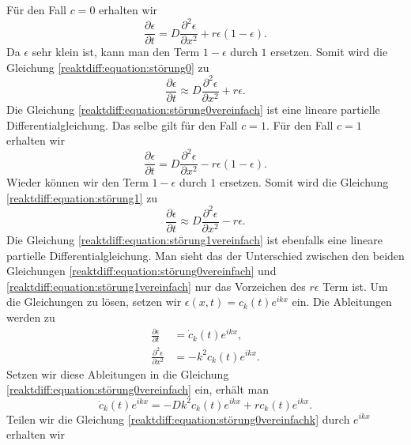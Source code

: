 Für den Fall \(c = 0\) erhalten wir
\begin{equation}
\label{reaktdiff:equation:störung0}
\frac{\partial \epsilon}{\partial t} = D \frac{\partial^2 \epsilon}{\partial x^2} + r\epsilon(1-\epsilon).
\end{equation}
Da \(\epsilon\) sehr klein ist, kann man den Term \(1-\epsilon\) durch \(1\) ersetzen.
Somit wird die Gleichung \ref{reaktdiff:equation:störung0} zu
\begin{equation}
\label{reaktdiff:equation:störung0vereinfach}
\frac{\partial \epsilon}{\partial t} \approx D \frac{\partial^2 \epsilon}{\partial x^2}  + r\epsilon.
\end{equation}
Die Gleichung \ref{reaktdiff:equation:störung0vereinfach} ist eine lineare partielle Differentialgleichung.
Das selbe gilt für den Fall \(c = 1\).
Für den Fall \(c = 1\) erhalten wir
\begin{equation}
\label{reaktdiff:equation:störung1}
\frac{\partial \epsilon}{\partial t} = D \frac{\partial^2 \epsilon}{\partial x^2} - r\epsilon(1-\epsilon).
\end{equation}
Wieder können wir den Term \(1-\epsilon\) durch \(1\) ersetzen.
Somit wird die Gleichung \ref{reaktdiff:equation:störung1} zu
\begin{equation}
\label{reaktdiff:equation:störung1vereinfach}
\frac{\partial \epsilon}{\partial t} \approx D \frac{\partial^2 \epsilon}{\partial x^2} - r\epsilon.
\end{equation}
Die Gleichung \ref{reaktdiff:equation:störung1vereinfach} ist ebenfalls eine lineare partielle Differentialgleichung.
Man sieht das der Unterschied zwischen den beiden Gleichungen \ref{reaktdiff:equation:störung0vereinfach} und \ref{reaktdiff:equation:störung1vereinfach} nur das Vorzeichen des \(r\epsilon\) Term ist.
Um die Gleichungen zu lösen, setzen wir \(\epsilon(x,t) = c_k(t) e^{ikx}\) ein.
Die Ableitungen werden zu
\begin{align*}
\frac{\partial \epsilon}{\partial t} &= \dot{c}_k(t) e^{ikx},\\
\frac{\partial^2 \epsilon}{\partial x^2} &= -k^2 c_k(t) e^{ikx}.
\end{align*}
Setzen wir diese Ableitungen in die Gleichung \ref{reaktdiff:equation:störung0vereinfach} ein, erhält man
\begin{equation}
\label{reaktdiff:equation:störung0vereinfachk}
\dot{c}_k(t) e^{ikx} = -D k^2 c_k(t) e^{ikx} + r c_k(t) e^{ikx}.
\end{equation}
Teilen wir die Gleichung \ref{reaktdiff:equation:störung0vereinfachk} durch \(e^{ikx}\) erhalten wir

